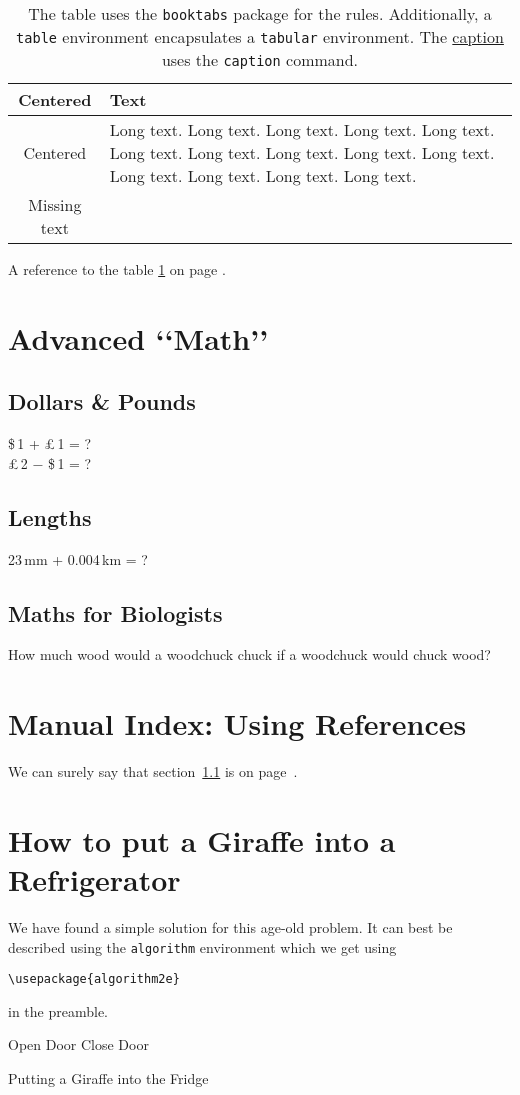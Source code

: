 \documentclass[a4paper,10pt]{article}
\begin{document}
\begin{table}[htb]
\caption{The table uses the \texttt{booktabs} package for the rules. Additionally, a \texttt{table} environment encapsulates a \texttt{tabular} environment. The \underline{caption} uses the \texttt{caption} command.}
\label{table}
 \begin{tabular}{c p{}}
 \toprule
  \textbf{Centered} & \textbf{Text}\\ \midrule
  Centered & Long text. Long text. Long text. Long text. Long text. Long text. Long text. Long text. Long text. Long text. Long text. Long text. Long text. Long text. \\
  Missing text & \\
  \bottomrule
 \end{tabular}
\end{table}

A reference to the table \ref{table} on page \pageref{table}.


\section{Advanced \lq\lq Math\rq\rq}
\subsection{Dollars \& Pounds}
\label{sec:dollarspounds}
\$\,1 + \pounds\,1 = ?\\
\pounds\,2 $-$ \$\,1 = ?
\subsection{Lengths}
23\,mm + 0.004\,km = ?
\subsection{Maths for Biologists}
How much wood would a woodchuck chuck if a woodchuck would chuck wood?

\section{Manual Index: Using References}
We can surely say that section~\ref{sec:dollarspounds} is on page~\pageref{sec:dollarspounds}.

\section{How to put a Giraffe into a Refrigerator}
We have found a simple solution for this age-old problem. It can best be described using the \verb=algorithm= environment which we get using
\begin{verbatim}
\usepackage{algorithm2e}
\end{verbatim}
in the preamble.
\begin{algorithm}
Open Door\;
Close Door\;
\caption{Putting a Giraffe into the Fridge}
\label{algorithm}
\end{algorithm}
\end{document}
